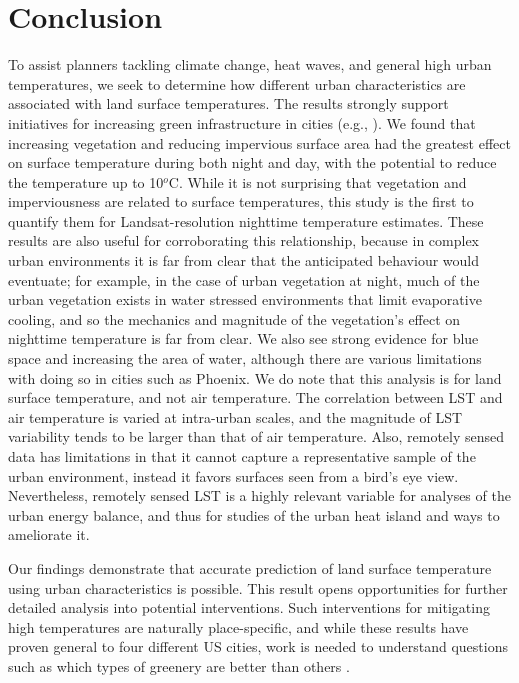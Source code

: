\documentclass[final,3p,times,onecolumn,sort&compress]{elsarticle}
\begin{document}
\section{Conclusion}
To assist planners tackling climate change, heat waves, and general high urban temperatures, we seek to determine how different urban characteristics are associated with land surface temperatures. 
The results strongly support initiatives for increasing green infrastructure in cities (e.g., \citep{Larsen2015-da, Meerow2017-xv}). 
We found that increasing vegetation and reducing impervious surface area had the greatest effect on surface temperature during both night and day, with the potential to reduce the temperature up to 10$^o$C.
While it is not surprising that vegetation and imperviousness are related to surface temperatures, this study is the first to quantify them for Landsat-resolution nighttime temperature estimates. 
These results are also useful for corroborating this relationship, because in complex urban environments it is far from clear that the anticipated behaviour would eventuate; for example, in the case of urban vegetation at night, much of the urban vegetation exists in water stressed environments that limit evaporative cooling, and so the mechanics and magnitude of the vegetation's effect on nighttime temperature is far from clear.
We also see strong evidence for blue space and increasing the area of water, although there are various limitations with doing so in cities such as Phoenix.
We do note that this analysis is for land surface temperature, and not air temperature. 
The correlation between LST and air temperature is varied at intra-urban scales, and the magnitude of LST variability tends to be larger than that of air temperature.
Also, remotely sensed data has limitations in that it cannot capture a representative sample of the urban environment, instead it favors surfaces seen from a bird's eye view.
Nevertheless, remotely sensed LST is a highly relevant variable for analyses of the urban energy balance, and thus for studies of the urban heat island and ways to ameliorate it.

Our findings demonstrate that accurate prediction of land surface temperature using urban characteristics is possible.
This result opens opportunities for further detailed analysis into potential interventions.
Such interventions for mitigating high temperatures are naturally place-specific, and while these results have proven general to four different US cities, work is needed to understand questions such as which types of greenery are better than others \citep{Gober2009-im}.
\end{document}
